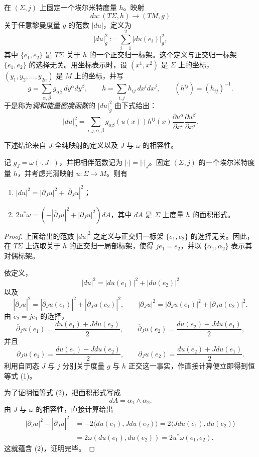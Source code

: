 在 $(\Sigma,j)$ 上固定一个埃尔米特度量 $h$。映射
\[
 du:(T\Sigma,h)\longrightarrow(TM,g)
\]
关于任意黎曼度量 $g$ 的范数 $|du|$，定义为
\[
 |du|_g^2:=\sum_{i=1}^2|du(e_i)|_g^2,
\]
其中 $\{e_1,e_2\}$ 是 $T\Sigma$ 关于 $h$ 的一个正交归一标架。这个定义与正交归一标架 $\{e_1,e_2\}$ 的选择无关。用坐标表示时，设 $(x^1,x^2)$ 是 $\Sigma$ 上的坐标，$(y_1,y_2,\ldots,y_{2n})$ 是 $M$ 上的坐标，并写
\[
 g=\sum_{\alpha,\beta}g_{\alpha\beta}\,dy^\alpha dy^\beta,
 \qquad
 h=\sum_{i,j}h_{ij}\,dx^i dx^j,
 \qquad (h^{ij})=(h_{ij})^{-1}.
\]
于是称为\emph{调和能量密度函数}的 $|du|_g^2$ 由下式给出：
\[
 |du|_g^2=\sum_{i,j,\alpha,\beta}
 g_{\alpha\beta}(u(x))h^{ij}(x)
 \frac{\partial u^\alpha}{\partial x^i}
 \frac{\partial u^\beta}{\partial x^j}.
\]

下述结论来自 $J$-全纯映射的定义以及 $J$ 与 $\omega$ 的相容性。

\begin{proposition}\label{prop:j-holomorphic-energy-identities}
记 $g_J=\omega(\cdot,J\cdot)$，并把相伴范数记为
$|\cdot|=|\cdot|_J$。固定 $(\Sigma,j)$ 的一个埃尔米特度量 $h$，并考虑光滑映射 $u:\Sigma\to M$。则有
\begin{enumerate}[label=(\arabic*)]
 \item $|du|^2=|\partial_Ju|^2+|\overline\partial_Ju|^2$；
 \item $2u^*\omega=(-|\overline\partial_Ju|^2+|\partial_Ju|^2)dA$，其中 $dA$ 是 $\Sigma$ 上度量 $h$ 的面积形式。
\end{enumerate}
\end{proposition}

\begin{proof}
上面给出的范数 $|du|^2$ 之定义与正交归一标架 $\{e_1,e_2\}$ 的选择无关。因此，在 $T\Sigma$ 上选取关于 $h$ 的正交归一局部标架，使得 $je_1=e_2$，并以 $\{\alpha_1,\alpha_2\}$ 表示其对偶标架。

依定义，
\[
 |du|^2=|du(e_1)|^2+|du(e_2)|^2
\]
以及
\[
 |\overline\partial_Ju|^2
 =|\overline\partial_Ju(e_1)|^2+|\overline\partial_Ju(e_2)|^2,
 \qquad
 |\partial_Ju|^2
 =|\partial_Ju(e_1)|^2+|\partial_Ju(e_2)|^2.
\]
由 $e_2=je_1$ 的选择，
\[
 \overline\partial_Ju(e_1)
 =\frac{du(e_1)+Jdu(e_2)}2,
 \qquad
 \overline\partial_Ju(e_2)
 =\frac{du(e_2)-Jdu(e_1)}2,
\]
并且
\[
 \partial_Ju(e_1)
 =\frac{du(e_1)-Jdu(e_2)}2,
 \qquad
 \partial_Ju(e_2)
 =\frac{du(e_2)+Jdu(e_1)}2.
\]
利用自同态 $J$ 与 $j$ 分别关于度量 $g$ 与 $h$ 正交这一事实，作直接计算便立即得到恒等式 (1)。

为了证明恒等式 (2)，把面积形式写成
\[
 dA=\alpha_1\wedge\alpha_2.
\]
由 $J$ 与 $\omega$ 的相容性，直接计算给出
\[
\begin{split}
 |\partial_Ju|^2-|\overline\partial_Ju|^2
 &=-2\langle du(e_1),Jdu(e_2)\rangle
 =2\langle Jdu(e_1),du(e_2)\rangle\\
 &=2\omega(du(e_1),du(e_2))
 =2u^*\omega(e_1,e_2).
\end{split}
\]
这就蕴含 (2)，证明完毕。
\end{proof}

